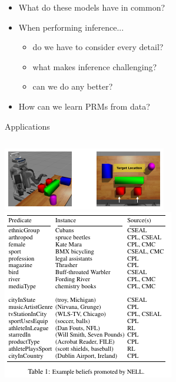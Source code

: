 \documentclass{beamer}
\begin{document}
\begin{frame}
  \begin{itemize}
  \item What do these models have in common?
  \item When performing inference...
    \begin{itemize}
    \item do we have to consider every detail?
    \item what makes inference challenging?
    \item can we do any better?
    \end{itemize}
  \item How can we learn PRMs from data?
  \end{itemize}
\end{frame}

\begin{frame}{Applications}
  \begin{columns}
    \begin{column}{0.5\textwidth}
      \centering
      \includegraphics[width=\textwidth,height=0.5\textheight,keepaspectratio]{application_robots.jpg}
      \\[-7pt]
      {\tiny \cite{DBLP:conf/iros/MoldovanR14}}
      \vfill
      \null
      \includegraphics[width=\textwidth,height=0.5\textheight,keepaspectratio]{application_nell.jpg}

\end{column}
\end{columns}
\end{frame}
\end{document}
